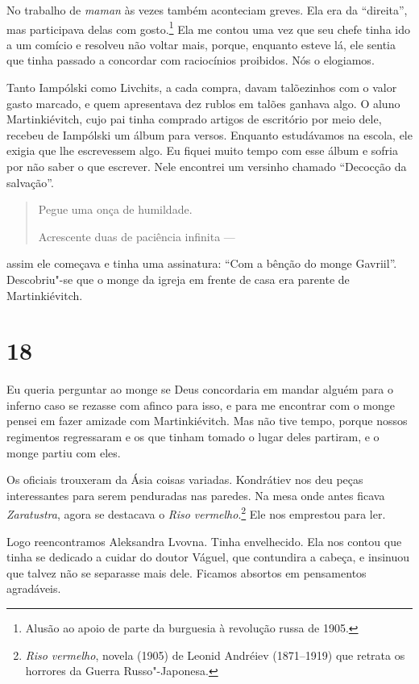 No trabalho de \emph{maman} às vezes também aconteciam greves. Ela era
da ``direita'', mas participava delas com gosto.\footnote{Alusão ao
  apoio de parte da burguesia à revolução russa de 1905.} Ela me contou %
uma vez que seu chefe tinha ido a um comício e resolveu não voltar mais,
porque, enquanto esteve lá, ele sentia que tinha passado a concordar com
raciocínios proibidos. Nós o elogiamos.

Tanto Iampólski como Livchits, a cada compra, davam talõezinhos com o
valor gasto marcado, e quem apresentava dez rublos em talões ganhava
algo. O aluno Martinkiévitch, cujo pai tinha comprado artigos de
escritório por meio dele, recebeu de Iampólski um álbum para versos.
Enquanto estudávamos na escola, ele exigia que lhe escrevessem algo. Eu
fiquei muito tempo com esse álbum e sofria por não saber o que escrever.
Nele encontrei um versinho chamado ``Decocção da salvação''.

\begin{quotation}
Pegue uma onça de humildade.

Acrescente duas de paciência infinita ---
\end{quotation}

assim ele começava e tinha uma assinatura: ``Com a bênção do monge %
Gavriil''. Descobriu"-se que o monge da igreja em frente de casa era
parente de Martinkiévitch.

\section{18}

Eu queria perguntar ao monge se Deus concordaria em mandar alguém para o
inferno caso se rezasse com afinco para isso, e para me encontrar com o
monge pensei em fazer amizade com Martinkiévitch. Mas não tive tempo,
porque nossos regimentos regressaram e os que tinham tomado o lugar
deles partiram, e o monge partiu com eles.

Os oficiais trouxeram da Ásia coisas variadas. Kondrátiev nos deu peças
interessantes para serem penduradas nas paredes. Na mesa onde antes
ficava \emph{Zaratustra}, agora se destacava o \emph{Riso
vermelho}.\footnote{\emph{Riso vermelho}, novela (1905) de Leonid
  Andréiev (1871--1919) que retrata os horrores da Guerra
  Russo"-Japonesa.} Ele nos emprestou para ler.

Logo reencontramos Aleksandra Lvovna. Tinha envelhecido. Ela nos contou
que tinha se dedicado a cuidar do doutor Váguel, que contundira a
cabeça, e insinuou que talvez não se separasse mais dele. Ficamos
absortos em pensamentos agradáveis.

